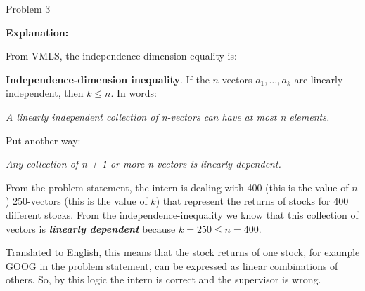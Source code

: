 \begin{problem}{Problem 3}
\begin{highlight}[Solution]
        \textbf{Explanation:} \vspace*{1em}

        From VMLS, the independence-dimension equality is:


        \textbf{Independence-dimension inequality}. If the $n$-vectors $a_{1}, \dots , a_{k}$ are linearly independent, then $k \leq n$. In words:
        
        \begin{center}
            \textit{A linearly independent collection of n-vectors can have at most n elements.}
        \end{center}

        Put another way:
        
        \begin{center}
            \textit{Any collection of n + 1 or more n-vectors is linearly dependent.}
        \end{center}


        From the problem statement, the intern is dealing with 400 (this is the value of $n$) 250-vectors (this is the value of $k$) that represent the returns of stocks for 400 different stocks. From the independence-inequality
        we know that this collection of vectors is \textit{\textbf{linearly dependent}} because $k = 250 \leq n = 400$.

        Translated to English, this means that the stock returns of one stock, for example GOOG in the problem statement, can be expressed as linear combinations of others. So, by this logic the intern is correct and the
        supervisor is wrong.
    \end{highlight}
\end{problem}

